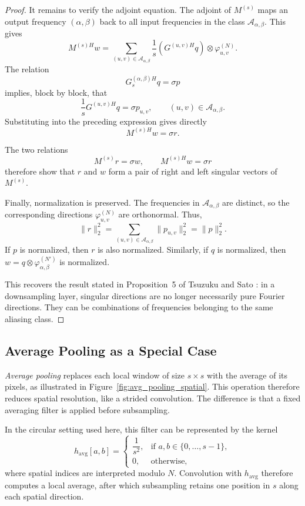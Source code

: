\begin{proof}
It remains to verify the adjoint equation. The adjoint of $M^{(s)}$ maps an output frequency
$(\alpha,\beta)$ back to all input frequencies in the class
$\mathcal{A}_{\alpha,\beta}$. This gives
\[
    M^{(s)H}w
    =
    \sum_{(u,v)\in\mathcal{A}_{\alpha,\beta}}
    \frac{1}{s}
    \left(
        G^{(u,v)H}q
    \right)
    \otimes
    \varphi_{u,v}^{(N)}.
\]
The relation
\[
    G_s^{(\alpha,\beta)H}q=\sigma p
\]
implies, block by block, that
\[
    \frac{1}{s}G^{(u,v)H}q
    =
    \sigma p_{u,v},
    \qquad
    (u,v)\in\mathcal{A}_{\alpha,\beta}.
\]
Substituting into the preceding expression gives directly
\begin{equation}
    M^{(s)H}w
    =
    \sigma r.
    \label{eq:relation_singuliere_stride_gauche}
\end{equation}

The two relations
\[
    M^{(s)}r=\sigma w,
    \qquad
    M^{(s)H}w=\sigma r
\]
therefore show that $r$ and $w$ form a pair of right and left singular vectors
of $M^{(s)}$.

Finally, normalization is preserved. The frequencies in
$\mathcal{A}_{\alpha,\beta}$ are distinct, so the corresponding directions
$\varphi_{u,v}^{(N)}$ are orthonormal. Thus,
\[
    \|r\|_2^2
    =
    \sum_{(u,v)\in\mathcal{A}_{\alpha,\beta}}
    \|p_{u,v}\|_2^2
    =
    \|p\|_2^2.
\]
If $p$ is normalized, then $r$ is also normalized. Similarly, if $q$ is normalized,
then $w=q\otimes \varphi_{\alpha,\beta}^{(N')}$ is normalized.

This recovers the result stated in Proposition~5 of Tsuzuku and Sato
\cite{tsuzuku2019structural}: in a downsampling layer, singular directions
are no longer necessarily pure Fourier directions. They can be combinations
of frequencies belonging to the same aliasing class.

\end{proof}

\subsection{Average Pooling as a Special Case}

\textit{Average pooling} replaces each local window of size $s\times s$
with the average of its pixels, as illustrated in Figure~\ref{fig:avg_pooling_spatial}. This operation therefore reduces spatial resolution, like a
strided convolution. The difference is that a fixed averaging filter is applied
before subsampling.

In the circular setting used here, this filter can be represented by the kernel
\[
    h_{\mathrm{avg}}[a,b]
    =
    \begin{cases}
        \dfrac{1}{s^2},
        & \text{if } a,b \in \{0,\dots,s-1\},\\[0.4em]
        0,
        & \text{otherwise,}
    \end{cases}
\]
where spatial indices are interpreted modulo $N$. Convolution with
$h_{\mathrm{avg}}$ therefore computes a local average, after which subsampling retains
one position in $s$ along each spatial direction.

